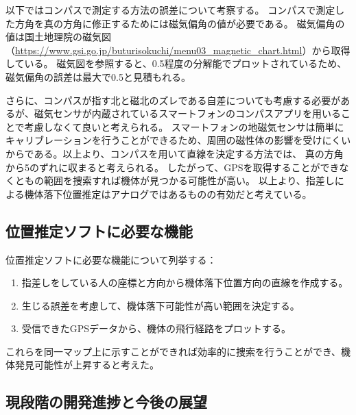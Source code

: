 \documentclass[a4paper,11pt,titlepage,uplatex]{jsarticle}
\begin{document}
以下ではコンパスで測定する方法の誤差について考察する。
コンパスで測定した方角を真の方角に修正するためには磁気偏角の値が必要である。
磁気偏角の値は国土地理院の磁気図（\url{https://www.gsi.go.jp/buturisokuchi/menu03_magnetic_chart.html}）から取得している。
磁気図を参照すると、\SI{0.5}{\deg}程度の分解能でプロットされているため、磁気偏角の誤差は最大で\SI{0.5}{\deg}と見積もれる。

さらに、コンパスが指す北と磁北のズレである自差についても考慮する必要があるが、磁気センサが内蔵されているスマートフォンのコンパスアプリを用いることで考慮しなくて良いと考えられる。
スマートフォンの地磁気センサは簡単にキャリブレーションを行うことができるため、周囲の磁性体の影響を受けにくいからである。以上より、コンパスを用いて直線を決定する方法では、
真の方角から\SI{5}{\deg}のずれに収まると考えられる。
したがって、GPSを取得することができなくともの範囲を捜索すれば機体が見つかる可能性が高い。
以上より、指差しによる機体落下位置推定はアナログではあるものの有効だと考えている。

\subsection{位置推定ソフトに必要な機能}
位置推定ソフトに必要な機能について列挙する：
\begin{enumerate}
    \item 指差しをしている人の座標と方向から機体落下位置方向の直線を作成する。
    \item 生じる誤差を考慮して、機体落下可能性が高い範囲を決定する。
    \item 受信できたGPSデータから、機体の飛行経路をプロットする。
\end{enumerate}
これらを同一マップ上に示すことができれば効率的に捜索を行うことができ、機体発見可能性が上昇すると考えた。

\subsection{現段階の開発進捗と今後の展望}
\end{document}
